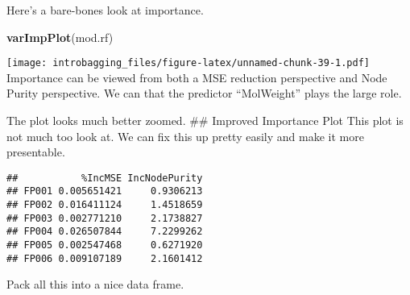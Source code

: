 \documentclass[]{article}
\newenvironment{Shaded}{\begin{snugshade}}{\end{snugshade}}
\newcommand{\CommentTok}[1]{\textcolor[rgb]{0.56,0.35,0.01}{\textit{#1}}}
\newcommand{\DataTypeTok}[1]{\textcolor[rgb]{0.13,0.29,0.53}{#1}}
\newcommand{\DecValTok}[1]{\textcolor[rgb]{0.00,0.00,0.81}{#1}}
\newcommand{\KeywordTok}[1]{\textcolor[rgb]{0.13,0.29,0.53}{\textbf{#1}}}
\newcommand{\NormalTok}[1]{#1}
\newcommand{\OperatorTok}[1]{\textcolor[rgb]{0.81,0.36,0.00}{\textbf{#1}}}
\newcommand{\StringTok}[1]{\textcolor[rgb]{0.31,0.60,0.02}{#1}}
\begin{document}
Here's a bare-bones look at importance.

\begin{Shaded}
\begin{Highlighting}[]
\KeywordTok{varImpPlot}\NormalTok{(mod.rf)}
\end{Highlighting}
\end{Shaded}

\texttt{[image: introbagging\_files/figure-latex/unnamed-chunk-39-1.pdf]}
Importance can be viewed from both a MSE reduction perspective and Node
Purity perspective. We can that the predictor ``MolWeight'' plays the
large role.

The plot looks much better zoomed. \#\# Improved Importance Plot This
plot is not much too look at. We can fix this up pretty easily and make
it more presentable.

\begin{Shaded}
\end{Shaded}

\begin{verbatim}
##           %IncMSE IncNodePurity
## FP001 0.005651421     0.9306213
## FP002 0.016411124     1.4518659
## FP003 0.002771210     2.1738827
## FP004 0.026507844     7.2299262
## FP005 0.002547468     0.6271920
## FP006 0.009107189     2.1601412
\end{verbatim}

\begin{Shaded}
\end{Shaded}

Pack all this into a nice data frame.

\begin{Shaded}
\end{Shaded}
\end{document}
